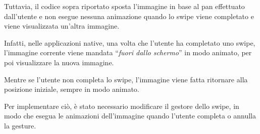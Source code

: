 \vspace{1em}
Tuttavia, il codice sopra riportato sposta l'immagine in base al pan effettuato dall'utente e non esegue nessuna animazione quando lo swipe viene completato e viene visualizzata un'altra immagine.

Infatti, nelle applicazioni native, una volta che l'utente ha completato uno swipe, l'immagine corrente viene mandata ``\textit{fuori dallo schermo}'' in modo animato, per poi visualizzare la nuova immagine.

Mentre se l'utente non completa lo swipe, l'immagine viene fatta ritornare alla posizione iniziale, sempre in modo animato.

Per implementare ciò, è stato necessario modificare il gestore dello swipe, in modo che esegua le animazioni dell'immagine quando l'utente completa o annulla la gesture.


